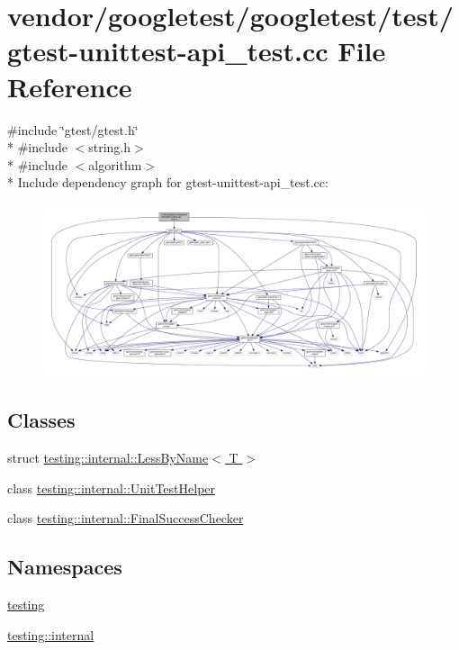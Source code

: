 \hypertarget{gtest-unittest-api__test_8cc}{}\section{vendor/googletest/googletest/test/gtest-\/unittest-\/api\+\_\+test.cc File Reference}
\label{gtest-unittest-api__test_8cc}
{\ttfamily \#include \char`\"{}gtest/gtest.\+h\char`\"{}}\\*
{\ttfamily \#include $<$string.\+h$>$}\\*
{\ttfamily \#include $<$algorithm$>$}\\*
Include dependency graph for gtest-\/unittest-\/api\+\_\+test.cc\+:\nopagebreak
\begin{figure}[H]
\begin{center}
\leavevmode
\includegraphics[width=350pt]{gtest-unittest-api__test_8cc__incl}
\end{center}
\end{figure}
\subsection*{Classes}
\begin{DoxyCompactItemize}
\item 
struct \hyperlink{structtesting_1_1internal_1_1LessByName}{testing\+::internal\+::\+Less\+By\+Name$<$ T $>$}
\item 
class \hyperlink{classtesting_1_1internal_1_1UnitTestHelper}{testing\+::internal\+::\+Unit\+Test\+Helper}
\item 
class \hyperlink{classtesting_1_1internal_1_1FinalSuccessChecker}{testing\+::internal\+::\+Final\+Success\+Checker}
\end{DoxyCompactItemize}
\subsection*{Namespaces}
\begin{DoxyCompactItemize}
\item 
 \hyperlink{namespacetesting}{testing}
\item 
 \hyperlink{namespacetesting_1_1internal}{testing\+::internal}
\end{DoxyCompactItemize}
